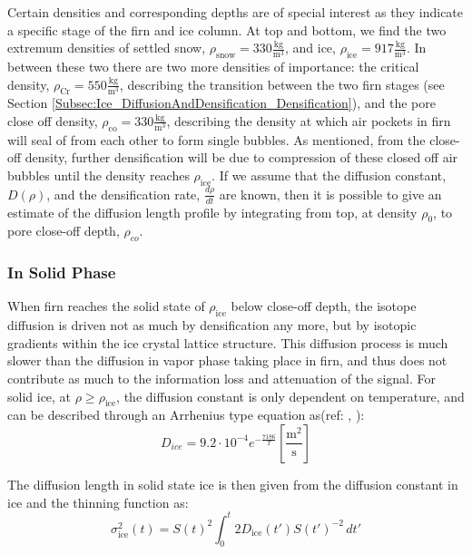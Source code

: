 \documentclass[../../CompleteThesis2/Complete_2ndDraft]{subfiles}
\begin{document}
Certain densities and corresponding depths are of special interest as they indicate a specific stage of the firn and ice column. At top and bottom, we find the two extremum densities of settled snow, $\rho_{\text{snow}} = 330 \frac{\text{kg}}{\text{m}^3}$, and ice, $\rho_{\text{ice}} = 917 \frac{\text{kg}}{\text{m}^3}$. In between these two there are two more densities of importance: the critical density, $\rho_{\text{Cr}} = 550 \frac{\text{kg}}{\text{m}^3}$, describing the transition between the two firn stages (see Section \ref{Subsec:Ice_DiffusionAndDensification_Densification}), and the pore close off density, $\rho_{\text{co}} = 330 \frac{\text{kg}}{\text{m}^3}$, describing the density at which air pockets in firn will seal of from each other to form single bubbles. As mentioned, from the close-off density, further densification will be due to compression of these closed off air bubbles until the density reaches $\rho_{\text{ice}}$.
If we assume that the diffusion constant, $D(\rho)$, and the densification rate, $\frac{d\rho}{dt}$ are known, then it is possible to give an estimate of the diffusion length profile by integrating from top, at density $\rho_0$, to pore close-off depth, $\rho_{co}$.



\subsubsection{In Solid Phase}
\label{Subsubsec:Ice_DiffusionAndDensification_Diffusion_Ice}
When firn reaches the solid state of $\rho_{\text{ice}}$ below close-off depth, the isotope diffusion is driven not as much by densification any more, but by isotopic gradients within the ice crystal lattice structure. This diffusion process is much slower than the diffusion in vapor phase taking place in firn, and thus does not contribute as much to the information loss and attenuation of the signal. For solid ice, at $\rho \geq \rho_{\text{ice}}$, the diffusion constant is only dependent on temperature, and can be described through an Arrhenius type equation as(ref: \cite[Ramseyer, 1967]{RAMSEIER1967}, \cite[Johnsen et al., 2000]{Johnsen2000}):
\begin{equation}
	D_{ice} = 9.2 \cdot 10^{-4} e^{-\frac{7186}{T}} 	\left[\frac{\text{m}^2}{\text{s}}\right]
	\label{Eq:Ice_Diff_const}
\end{equation}

The diffusion length in solid state ice is then given from the diffusion constant in ice and the thinning function as:
\begin{equation}
	\sigma^2_{\text{ice}}(t) = S(t)^2 \int_{0}^{t}2 D_{\text{ice}}(t') S(t')^{-2} \, dt'
	\label{Eq:Diff_Len_Ice}
\end{equation}
\end{document}

